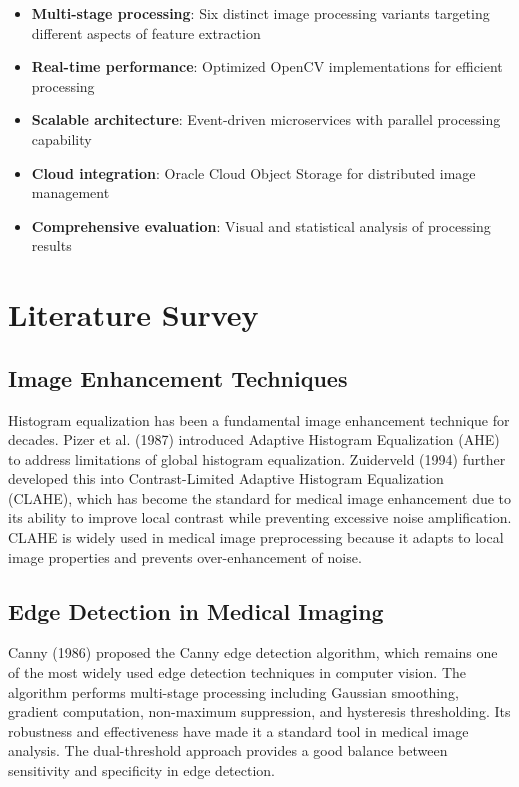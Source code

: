 \documentclass[12pt,a4paper]{article}
\begin{document}
\begin{itemize}
    \item \textbf{Multi-stage processing}: Six distinct image processing variants targeting different aspects of feature extraction
    \item \textbf{Real-time performance}: Optimized OpenCV implementations for efficient processing
    \item \textbf{Scalable architecture}: Event-driven microservices with parallel processing capability
    \item \textbf{Cloud integration}: Oracle Cloud Object Storage for distributed image management
    \item \textbf{Comprehensive evaluation}: Visual and statistical analysis of processing results
\end{itemize}

\newpage

\section{Literature Survey}

\subsection{Image Enhancement Techniques}

Histogram equalization has been a fundamental image enhancement technique for decades. Pizer et al. (1987) introduced Adaptive Histogram Equalization (AHE) to address limitations of global histogram equalization. Zuiderveld (1994) further developed this into Contrast-Limited Adaptive Histogram Equalization (CLAHE), which has become the standard for medical image enhancement due to its ability to improve local contrast while preventing excessive noise amplification. CLAHE is widely used in medical image preprocessing because it adapts to local image properties and prevents over-enhancement of noise.

\subsection{Edge Detection in Medical Imaging}

Canny (1986) proposed the Canny edge detection algorithm, which remains one of the most widely used edge detection techniques in computer vision. The algorithm performs multi-stage processing including Gaussian smoothing, gradient computation, non-maximum suppression, and hysteresis thresholding. Its robustness and effectiveness have made it a standard tool in medical image analysis. The dual-threshold approach provides a good balance between sensitivity and specificity in edge detection.
\end{document}
